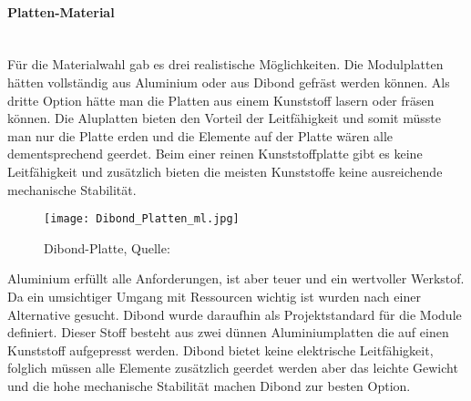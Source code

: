     \paragraph{Platten-Material}\mbox{}\\
    Für die Materialwahl gab es drei realistische Möglichkeiten. Die Modulplatten hätten vollständig aus Aluminium oder aus Dibond gefräst werden können. Als dritte Option hätte man die Platten aus einem Kunststoff lasern oder fräsen können. Die Aluplatten bieten den Vorteil der Leitfähigkeit und somit müsste man nur die Platte erden und die Elemente auf der Platte wären alle dementsprechend geerdet. Beim einer reinen Kunststoffplatte gibt es keine Leitfähigkeit und zusätzlich bieten die meisten Kunststoffe keine ausreichende mechanische Stabilität.\\
    \begin{figure}[h]
        \centering
        \texttt{[image: Dibond\_Platten\_ml.jpg]}
        \caption{Dibond-Platte, Quelle: \cite{Dibond-Platte}}
        \label{fig:Sommerprototyp}
    \end{figure}  
    Aluminium erfüllt alle Anforderungen, ist aber teuer und ein wertvoller Werkstof. Da ein umsichtiger Umgang mit Ressourcen wichtig ist wurden nach einer Alternative gesucht. Dibond wurde daraufhin als Projektstandard für die Module definiert. Dieser Stoff besteht aus zwei dünnen Aluminiumplatten die auf einen Kunststoff aufgepresst werden. Dibond bietet keine elektrische Leitfähigkeit, folglich müssen alle Elemente zusätzlich geerdet werden aber das leichte Gewicht und die hohe mechanische Stabilität machen Dibond zur besten Option.

